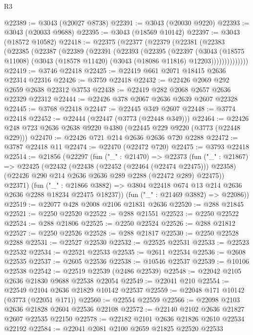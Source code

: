 \begin{lexlean}{R3}
\begin{coremodule}
@22389 := @3043 (@20027 @8738)
@22391 := @3043 (@20030 @9220)
@22393 := @3043 (@20033 @9688)
@22395 := @3043 (@18569 @10142)
@22397 := @3043 (@18572 @10582)
@22418 := @22375
    (@22377
      (@22379
        (@22381
          (@22383
            (@22385
              (@22387
                (@22389
                  (@22391
                    (@22393
                      (@22395
                        (@22397
                          (@3043
                            (@18575 @11008)
                            (@3043 (@18578 @11420) (@3043 (@18086 @11816) @12203))))))))))))))
@22419 := @3746 @22418
@22425 := @22419 @661 @2071 @18415 @2636 @22314 @22316
@22426 := @3759 @22418
@22432 := @22426 @2069 @292 @2659 @2638 @22312 @3753
@22438 := @22419 @282 @2068 @2657 @2636 @22329 @22312
@22444 := @22426 @378 @2067 @2636 @2639 @2607 @22328
@22445 := @3768 @22418
@22447 := @22445 @349 @2607
@22448 := @3774 @22418
@22452 := @22444 (@22447 (@3773 (@22448 @349)))
@22464 := @22426 @248 @723 @2636 @2638 @9220 @4380 (@22445 @229 @9220 (@3773 (@22448 @229)))
@22470 := @22426 @721 @214 @2636 @2636 @720 @2288
@22472 := @3787 @22418 @11
@22474 := @22470 (@22472 @720)
@22475 := @3793 @22418
@22514 := @21856
    (@22297
      (fun ("_" : @21470) =>
      @22373
        (fun ("_" : @21867) =>
        @22425
          (@22432
            (@22438 (@22452 (@22464 (@22474 @22475))) @22358)
            (@22426 @290 @214 @2636 @2636 @289 @2288 (@22472 @289) @22475))
          @22371)
        (fun ("_" : @21866 @3882) =>
        @3804 @22418 @674 @13 @214 @2636 @2636 @2288 @18234 @22475 @18237))
      (fun ("_" : @21469 @3882) => @22086))
@22519 := @22077 @428 @2008 @2106 @21831 @2636
@22520 := @288 @21845
@22521 := @2250 @22520
@22522 := @288 @21551
@22523 := @2250 @22522
@22524 := @288 @21806
@22525 := @2250 @22524
@22526 := @288 @21812
@22527 := @2250 @22526
@22528 := @288 @21817
@22530 := @2250 @22528 @2288
@22531 := @22527 @22530
@22532 := @22525 @22531
@22533 := @22523 @22532
@22534 := @22521 @22533
@22535 := @2611 @22534
@22536 := @2608 @22535
@22537 := @2605 @22536
@22538 := @10546 @22537
@22539 := @10106 @22538
@22542 := @22519 @22539 (@2486 @22539)
@22548 := @22042 @2105 @2636 @21830 @9688 @22538 @22054
@22549 := @22041 @210
@22554 := @22549 @2104 @2636 @21829 @10142 @22537
@22559 := @22048 @171 @10142 (@3773 (@22051 @171))
@22560 := @22554 @22559
@22566 := @22098 @2103 @2636 @21828 @2604 @22536 @22108
@22572 := @22140 @2102 @2636 @21827 @2607 @22535 @22150
@22578 := @22182 @2101 @2636 @21826 @2610 @22534 @22192
@22584 := @22041 @2081 @2100 @2659 @21825 @22520 @22533

\end{coremodule}
\end{lexlean}
